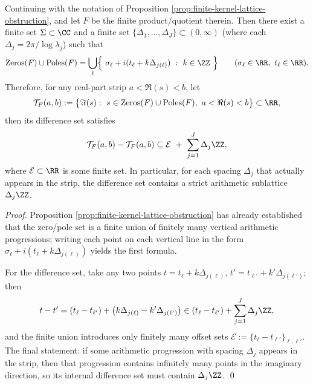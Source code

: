 \begin{corollary}\label{cor:finite-determinant-arithmetic-lattice}
Continuing with the notation of Proposition \ref{prop:finite-kernel-lattice-obstruction}, and let \(F\) be the finite product/quotient therein.
Then there exist a finite set \(\Sigma\subset\CC\) and a finite set \(\{\Delta_1,\dots,\Delta_J\}\subset(0,\infty)\) (where each \(\Delta_j=2\pi/\log\lambda_j\)) such that
\[
\mathrm{Zeros}(F)\cup\mathrm{Poles}(F)
=\bigcup_{\ell}\Bigl\{\ \sigma_\ell+i(t_\ell+k\Delta_{j(\ell)})\ :\ k\in\ZZ\ \Bigr\}
\qquad(\sigma_\ell\in\RR,\ t_\ell\in\RR).
\]
Therefore, for any real-part strip \(a<\Re(s)<b\), let
\[
\mathcal{T}_{F}(a,b)
:=\bigl\{\Im(s):\ s\in\mathrm{Zeros}(F)\cup\mathrm{Poles}(F),\ a<\Re(s)<b\bigr\}\subset\RR,
\]
then its difference set satisfies
\[
\mathcal{T}_{F}(a,b)-\mathcal{T}_{F}(a,b)
\subseteq
\mathcal{E}\ +\ \sum_{j=1}^{J}\Delta_j\ZZ,
\]
where \(\mathcal{E}\subset\RR\) is some finite set. In particular, for each spacing \(\Delta_j\) that actually appears in the strip, the difference set contains a strict arithmetic sublattice \(\Delta_j\ZZ\).
\end{corollary}
\begin{proof}
Proposition \ref{prop:finite-kernel-lattice-obstruction} has already established that the zero/pole set is a finite union of finitely many vertical arithmetic progressions; writing each point on each vertical line in the form \(\sigma_\ell+i(t_\ell+k\Delta_{j(\ell)})\) yields the first formula.
\par
For the difference set, take any two points \(t=t_\ell+k\Delta_{j(\ell)}\), \(t'=t_{\ell'}+k'\Delta_{j(\ell')}\); then
\[
t-t'=(t_\ell-t_{\ell'})+\bigl(k\Delta_{j(\ell)}-k'\Delta_{j(\ell')}\bigr)\in (t_\ell-t_{\ell'})+\sum_{j=1}^J\Delta_j\ZZ,
\]
and the finite union introduces only finitely many offset sets
\(
\mathcal{E}:=\{t_\ell-t_{\ell'}\}_{\ell,\ell'}.
\)
The final statement: if some arithmetic progression with spacing \(\Delta_j\) appears in the strip, then that progression contains infinitely many points in the imaginary direction, so its internal difference set must contain \(\Delta_j\ZZ\). \qed
\end{proof}

